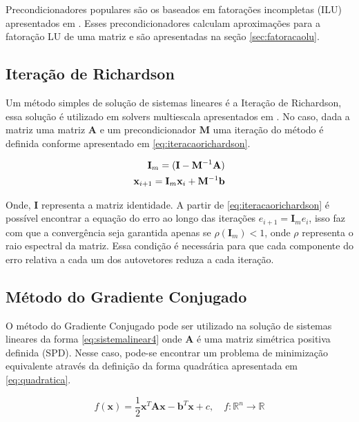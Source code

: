 Precondicionadores populares são os baseados em fatorações incompletas (ILU) apresentados em \citet{ilupaper}. Esses precondicionadores calculam aproximações para a fatoração LU de uma matriz e são apresentadas na seção \ref{sec:fatoracaolu}.

\subsection{Iteração de Richardson}

Um método simples de solução de sistemas lineares é a Iteração de Richardson, essa solução é utilizado em solvers multiescala apresentados em \citet{msparalelo}. No caso, dada a matriz uma matriz $\mathbf{A}$ e um precondicionador $\mathbf{M}$ uma iteração do método é definida conforme apresentado em \eqref{eq:iteracaorichardson}.

\begin{align} \label{eq:iteracaorichardson}
\mathbf{I}_m = (\mathbf{I} - \mathbf{M}^{-1} \mathbf{A})    \\
\mathbf{x}_{i+1} = \mathbf{I}_m  \mathbf{x}_i + \mathbf{M}^{-1} \mathbf{b}  
\end{align}

Onde, $\mathbf{I}$ representa a matriz identidade. A partir de \eqref{eq:iteracaorichardson} é possível encontrar a equação do erro ao longo das iterações $e_{i+1} = \mathbf{I}_m e_i$, isso faz com que a convergência seja garantida apenas se $\rho(\mathbf{I}_m) < 1$, onde $\rho$ representa o raio espectral da matriz. Essa condição é necessária para que cada componente do erro relativa a cada  um dos autovetores reduza a cada iteração.


\subsection{Método do Gradiente Conjugado}

O método do Gradiente Conjugado pode ser utilizado na solução de sistemas lineares da forma \eqref{eq:sistemalinear4} onde $\mathbf{A}$ é uma matriz simétrica positiva definida (SPD). Nesse caso, pode-se encontrar um problema de minimização equivalente através da definição da forma quadrática apresentada em \eqref{eq:quadratica}. 

\begin{equation} \label{eq:quadratica}
    f(\mathbf{x}) = \frac{1}{2}  \mathbf{x}^T \mathbf{A} \mathbf{x} - \mathbf{b}^T \mathbf{x} + c, \quad f:\mathbb{R}^n \rightarrow \mathbb{R}
\end{equation}

